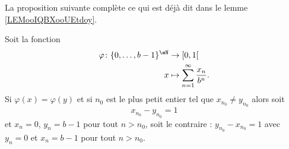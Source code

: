La proposition suivante complète ce qui est déjà dit dans le lemme \ref{LEMooIQBXooUEtdoy}.
\begin{proposition} \label{PropSAOoofRlQR}
    Soit la fonction
    \begin{equation}
        \begin{aligned}
            \varphi\colon \{ 0,\ldots, b-1 \}^{\eN}&\to \mathopen[ 0 , 1 [ \\
                x&\mapsto \sum_{n=1}^{\infty}\frac{ x_n }{ b^n }.
        \end{aligned}
    \end{equation}
    Si \( \varphi(x)=\varphi(y)\) et si \( n_0\) est le plus petit entier tel que \( x_{n_0}\neq y_{n_0}\) alors soit
    \begin{equation}
        x_{n_0}-y_{n_0}=1
    \end{equation}
    et \( x_n=0\), \( y_n=b-1\) pour tout \( n>n_0\), soit le contraire : \( y_{n_0}-x_{n_0}=1\) avec \( y_n=0\) et \( x_n=b-1\) pour tout \( n>n_0\).
\end{proposition}

